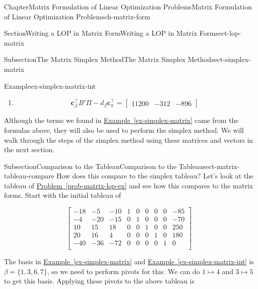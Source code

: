 \documentclass[oneside,10pt,]{book}
\newcommand{\xreffont}{\relax}
\numberwithin{equation}{section}
\newcommand{\amp}{&}
\begin{document}
\begin{chapterptx}{Chapter}{Matrix Formulation of Linear Optimization Problems}{}{Matrix Formulation of Linear Optimization Problems}{}{}{ch-matrix-form}
\begin{sectionptx}{Section}{Writing a LOP in Matrix Form}{}{Writing a LOP in Matrix Form}{}{}{sect-lop-matrix}
\begin{subsectionptx}{Subsection}{The Matrix Simplex Method}{}{The Matrix Simplex Method}{}{}{sect-simplex-matrix}
\begin{example}{Example}{}{ex-simplex-matrix-int}
\begin{enumerate}
\begin{equation*}
\end{equation*}
%
\item{}%
\begin{equation*}
\boldsymbol{c}_{\beta}^{\intercal} B' \Pi - d_{\beta} \boldsymbol{c}_{\pi}^{\intercal} = \begin{bmatrix} 11200 \amp  -312 \amp -896 \end{bmatrix}
\end{equation*}
%
\end{enumerate}
%
\end{example}
Although the terms we found in \hyperref[ex-simplex-matrix]{Example~{\xreffont\ref{ex-simplex-matrix}}} came from the formulas above, they will also be used to perform the simplex method. We will walk through the steps of the simplex method using these matrices and vectors in the next section.%
\end{subsectionptx}
%
%
\typeout{************************************************}
\typeout{************************************************}
%
\begin{subsectionptx}{Subsection}{Comparison to the Tableau}{}{Comparison to the Tableau}{}{}{sect-matrix-tableau-compare}
How does this compare to the simplex tableau?  Let's look at the tableau of \hyperref[prob-matrix-lop-ex]{Problem~{\xreffont\ref{prob-matrix-lop-ex}}} and see how this compares to the matrix forms.  Start with the initial tableau of%
\par
%
\begin{equation*}
\left[\begin{array}{rrr|rrrrr|r}
-18 \amp -5 \amp -10 \amp 1 \amp 0 \amp 0 \amp 0 \amp 0 \amp -85\\
-4 \amp -20 \amp -15 \amp 0 \amp 1 \amp 0 \amp 0 \amp 0 \amp -70\\
10 \amp 15 \amp 18 \amp 0 \amp 0 \amp 1 \amp 0 \amp 0 \amp 250\\
20 \amp 16 \amp 4 \amp 0 \amp 0 \amp 0 \amp 1 \amp 0 \amp 180\\ \hline
-40 \amp -36 \amp -72 \amp 0 \amp 0 \amp 0 \amp 0 \amp 1 \amp 0\\
\end{array} \right]
\end{equation*}
%
\par
The basis in \hyperref[ex-simplex-matrix]{Example~{\xreffont\ref{ex-simplex-matrix}}} and \hyperref[ex-simplex-matrix-int]{Example~{\xreffont\ref{ex-simplex-matrix-int}}} is \(\beta=\{1,3,6,7\}\), so we need to perform pivots for this.  We can do \(1 \mapsto 4\) and \(3 \mapsto 5\) to get this basis.  Applying these pivots to the above tableau is%

\end{subsectionptx}
\end{sectionptx}
\end{chapterptx}
\end{document}
